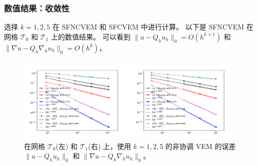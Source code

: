 \documentclass[notheorems,serif]{beamer}
\begin{document}
\begin{frame}
    \frametitle{数值结果：收敛性}
选择 $k = 1, 2, 5$ 在 SFNCVEM 和 SFCVEM 中进行计算。
以下是 SFNCVEM 在网格 $\mathcal T_0$ 和 $\mathcal T_1$ 上的数值结果。
可以看到 $\|u - Q_h u_h\|_0=O(h^{k+1})$ 和 $\|\nabla u -
Q_{h}\nabla_h u_h\|_0=O(h^{k})$， 
\begin{figure}[htbp]
\centering
\begin{minipage}[t]{0.49\linewidth}
\centering
\includegraphics[width=5.5cm]{../figures/stabfree/ncvem_convex.pdf}
\end{minipage}%
\begin{minipage}[t]{0.49\linewidth}
\centering
\includegraphics[width=5.5cm]{../figures/stabfree/ncvem_nonconvex.pdf}
\end{minipage}%
\centering
\caption{在网格 $\mathcal T_0$(左) 和 $\mathcal T_1$(右) 上，使用 $k=1, 2, 5$
的非协调 VEM 的误差 $\|u - Q_h u_h\|_0$ 和 $\|\nabla u - Q_{h}\nabla_h u_h\|_0$。}
\label{fig:rate1}
\end{figure}
\end{frame}
\end{document}
